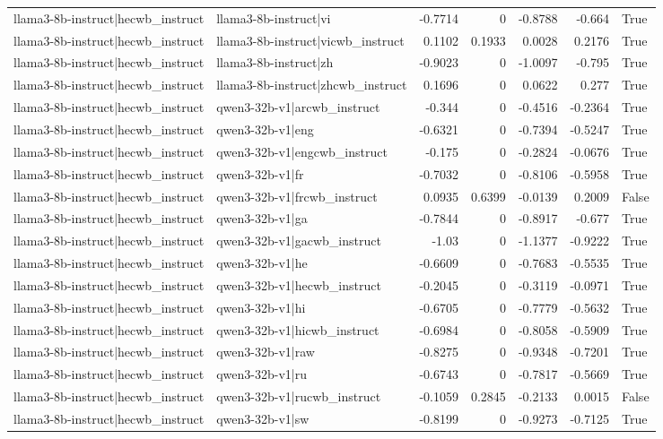 \begin{table}
\begin{tabular}{l l r r r r l}
llama3-8b-instruct|hecwb_instruct & llama3-8b-instruct|vi & -0.7714 & 0 & -0.8788 & -0.664 & True \\
llama3-8b-instruct|hecwb_instruct & llama3-8b-instruct|vicwb_instruct & 0.1102 & 0.1933 & 0.0028 & 0.2176 & True \\
llama3-8b-instruct|hecwb_instruct & llama3-8b-instruct|zh & -0.9023 & 0 & -1.0097 & -0.795 & True \\
llama3-8b-instruct|hecwb_instruct & llama3-8b-instruct|zhcwb_instruct & 0.1696 & 0 & 0.0622 & 0.277 & True \\
llama3-8b-instruct|hecwb_instruct & qwen3-32b-v1|arcwb_instruct & -0.344 & 0 & -0.4516 & -0.2364 & True \\
llama3-8b-instruct|hecwb_instruct & qwen3-32b-v1|eng & -0.6321 & 0 & -0.7394 & -0.5247 & True \\
llama3-8b-instruct|hecwb_instruct & qwen3-32b-v1|engcwb_instruct & -0.175 & 0 & -0.2824 & -0.0676 & True \\
llama3-8b-instruct|hecwb_instruct & qwen3-32b-v1|fr & -0.7032 & 0 & -0.8106 & -0.5958 & True \\
llama3-8b-instruct|hecwb_instruct & qwen3-32b-v1|frcwb_instruct & 0.0935 & 0.6399 & -0.0139 & 0.2009 & False \\
llama3-8b-instruct|hecwb_instruct & qwen3-32b-v1|ga & -0.7844 & 0 & -0.8917 & -0.677 & True \\
llama3-8b-instruct|hecwb_instruct & qwen3-32b-v1|gacwb_instruct & -1.03 & 0 & -1.1377 & -0.9222 & True \\
llama3-8b-instruct|hecwb_instruct & qwen3-32b-v1|he & -0.6609 & 0 & -0.7683 & -0.5535 & True \\
llama3-8b-instruct|hecwb_instruct & qwen3-32b-v1|hecwb_instruct & -0.2045 & 0 & -0.3119 & -0.0971 & True \\
llama3-8b-instruct|hecwb_instruct & qwen3-32b-v1|hi & -0.6705 & 0 & -0.7779 & -0.5632 & True \\
llama3-8b-instruct|hecwb_instruct & qwen3-32b-v1|hicwb_instruct & -0.6984 & 0 & -0.8058 & -0.5909 & True \\
llama3-8b-instruct|hecwb_instruct & qwen3-32b-v1|raw & -0.8275 & 0 & -0.9348 & -0.7201 & True \\
llama3-8b-instruct|hecwb_instruct & qwen3-32b-v1|ru & -0.6743 & 0 & -0.7817 & -0.5669 & True \\
llama3-8b-instruct|hecwb_instruct & qwen3-32b-v1|rucwb_instruct & -0.1059 & 0.2845 & -0.2133 & 0.0015 & False \\
llama3-8b-instruct|hecwb_instruct & qwen3-32b-v1|sw & -0.8199 & 0 & -0.9273 & -0.7125 & True \\

\end{tabular}
\end{table}

